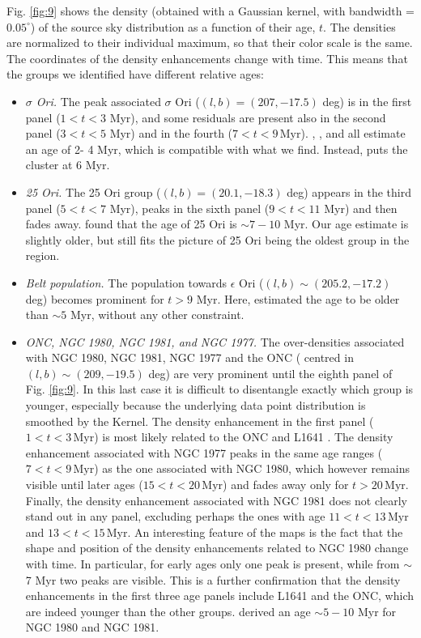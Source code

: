 \documentclass[onecolumn]{aa} %
\begin{document}
Fig. \ref{fig:9} shows the density (obtained with a Gaussian kernel, with bandwidth = $0.05^{\circ}$) of the source sky distribution as a function of their age, $t$. The densities are normalized to their individual maximum, so that their color scale is the same. The coordinates of the density enhancements change with time. This means that the groups we identified have different relative ages:
\begin{itemize}
\item \textit{$\sigma$ Ori.}
The peak associated $\sigma$ Ori ($(l, b) = (207, -17.5)$ deg) is in the first panel ($1 < t < 3$ Myr), and some residuals are present also in the second panel ($3 < t < 5$ Myr) and in the fourth ($7 < t < 9 \, \mathrm{Myr}$). 
\cite{Hernandez2007}, \cite{Sherry2008}, and \cite{Zapatero2002}  all  estimate an age  of  2-
4 Myr, which is compatible with what we find. Instead, \cite{Bell2013} puts the cluster at 6 Myr. 

\item \textit{25 Ori.}
The 25 Ori group ($(l, b) = (20.1, -18.3)$ deg) appears in the third panel ($5 < t < 7 $ Myr), peaks in the sixth panel ($9 < t < 11 $ Myr) and then fades away. \cite{Briceno2007} found that the age of 25 Ori is $\sim 7-10$ Myr. Our age estimate is slightly older, but still fits the picture of 25 Ori being the oldest group in the region. 

\item{\textit{Belt population.}}
The population towards $\epsilon$ Ori ($(l, b) \sim (205.2, -17.2)$ deg) becomes prominent for $t >  9$ Myr. Here, \cite{Kubiak2016} estimated the age to be older than $\sim 5$ Myr, without any other constraint.

\item{\textit{ONC, NGC 1980, NGC 1981, and NGC 1977.}}
The over-densities associated with NGC 1980, NGC 1981, NGC 1977 and the ONC ( centred in $(l, b) \sim (209, -19.5)$ deg)  are very prominent until the eighth  panel of Fig. \ref{fig:9}. In this last case it is difficult to disentangle exactly which group is younger, especially because the underlying data point distribution is smoothed by the Kernel.
The density enhancement in the first panel ($1 < t < 3 \, \mathrm{Myr}$) is most likely related to the ONC and L1641 \citep{Reggiani2011, DaRio2014, DaRio2016}.
The density enhancement associated with NGC 1977 peaks in the same age ranges  ($7 < t < 9 \, \mathrm{Myr}$) as the one associated with NGC 1980, which however remains visible until later ages ($15 < t < 20 \, \mathrm{Myr}$) and fades away only for $t > 20 \, \mathrm{Myr}$. Finally, the density enhancement associated with NGC 1981 does not clearly stand out in any panel, excluding perhaps the ones with age $11 < t < 13 \, \mathrm{Myr}$ and $13 < t < 15 \, \mathrm{Myr}$. 
An interesting feature of the maps is the fact that the shape and position of the density enhancements related to NGC 1980 change with time. In particular, for early ages only one peak is present, while from $\sim$7 Myr two peaks are visible. This is a further confirmation that the density enhancements in 
the first three age panels include L1641 and the ONC, which are indeed younger than the other groups. 
\cite{Bouy2014} derived an age $\sim 5-10$ Myr for NGC 1980 and NGC 1981.


\end{itemize}
\end{document}
